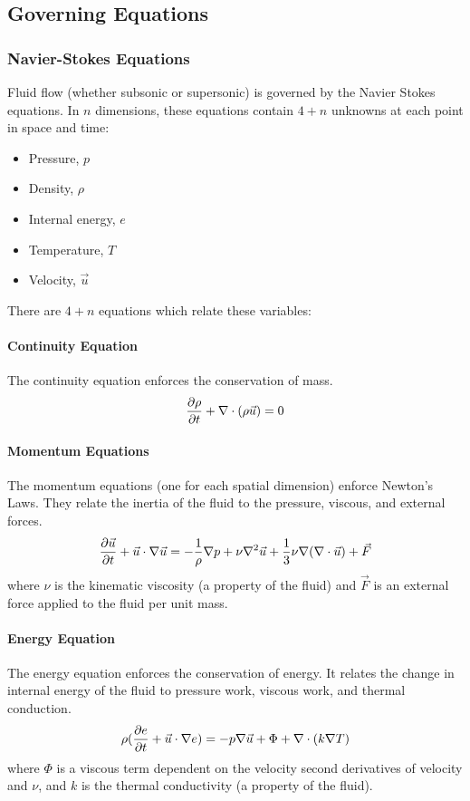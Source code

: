 \documentclass[paper=a4, fontsize=11pt]{scrartcl}
\numberwithin{equation}{section}        %
\numberwithin{figure}{section}          %
\numberwithin{table}{section}               %
\begin{document}
\subsection{Governing Equations}
\subsubsection{Navier-Stokes Equations}
Fluid flow (whether subsonic or supersonic) is governed by the Navier Stokes equations. In $n$ dimensions, these equations contain $4 + n$ unknowns at each point in space and time:
\begin{itemize}
    \item Pressure, $p$
    \item Density, $\rho$
    \item Internal energy, $e$
    \item Temperature, $T$
    \item Velocity, $\vec{u}$
\end{itemize}

There are $4 + n$ equations which relate these variables:

\paragraph{Continuity Equation}
The continuity equation enforces the conservation of mass.
\begin{equation}
    \pdv{\rho}{t} + \nabla \cdot (\rho \vec{u}) = 0
\end{equation}

\paragraph{Momentum Equations}
The momentum equations (one for each spatial dimension) enforce Newton's Laws. They relate the inertia of the fluid to the pressure, viscous, and external forces.
\begin{equation}
    \pdv{\vec{u}}{t} + \vec{u} \cdot \nabla \vec{u} = - \frac{1}{\rho} \nabla p + \nu \nabla^2 \vec{u} + \frac{1}{3} \nu \nabla (\nabla \cdot \vec{u}) + \vec{F}
\end{equation}
where $\nu$ is the kinematic viscosity (a property of the fluid) and $\vec{F}$ is an external force applied to the fluid per unit mass.

\paragraph{Energy Equation}
The energy equation enforces the conservation of energy. It relates the change in internal energy of the fluid to pressure work, viscous work, and thermal conduction.
\begin{equation}
    \rho(\pdv{e}{t} + \vec{u} \cdot \nabla e) = - p \nabla \vec{u} + \Phi + \nabla \cdot (k \nabla T)
\end{equation}
where $\Phi$ is a viscous term dependent on the velocity second derivatives of velocity and $\nu$, and $k$ is the thermal conductivity (a property of the fluid).
\end{document}
